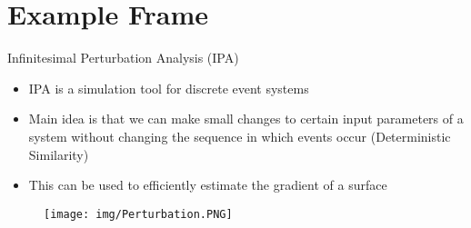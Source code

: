 \documentclass{CMI-beamer}
\begin{document}
\section{Example Frame}

\begin{frame}{Infinitesimal Perturbation Analysis (IPA)}
\begin{itemize}
    \item IPA is a simulation tool for discrete event systems
    \item Main idea is that we can make small changes to certain input parameters of a system without changing the sequence in which events occur (Deterministic Similarity)\footnotemark
    \item This can be used to efficiently estimate the gradient of a surface \footnotemark
\end{itemize}
\begin{figure}
    \centering
    \texttt{[image: img/Perturbation.PNG]}
\end{figure}
\end{frame}
\end{document}
